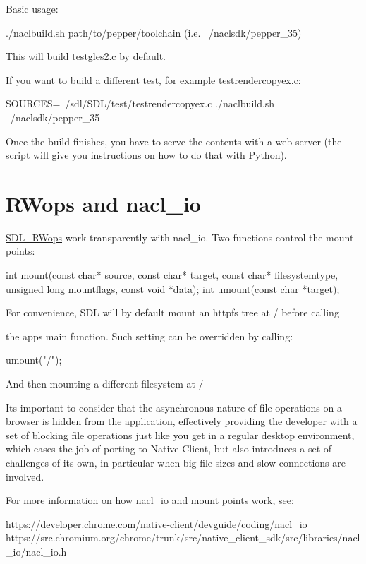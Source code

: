 Basic usage\+: \begin{DoxyVerb}./naclbuild.sh path/to/pepper/toolchain (i.e. ~/naclsdk/pepper_35)
\end{DoxyVerb}


This will build testgles2.\+c by default.

If you want to build a different test, for example testrendercopyex.\+c\+: \begin{DoxyVerb}SOURCES=~/sdl/SDL/test/testrendercopyex.c ./naclbuild.sh ~/naclsdk/pepper_35
\end{DoxyVerb}


Once the build finishes, you have to serve the contents with a web server (the script will give you instructions on how to do that with Python). 

 \section*{R\+Wops and nacl\+\_\+io }

\mbox{\hyperlink{struct_s_d_l___r_wops}{S\+D\+L\+\_\+\+R\+Wops}} work transparently with nacl\+\_\+io. Two functions control the mount points\+: \begin{DoxyVerb}int mount(const char* source, const char* target, 
                  const char* filesystemtype, 
                  unsigned long mountflags, const void *data);
int umount(const char *target);

For convenience, SDL will by default mount an httpfs tree at / before calling 
\end{DoxyVerb}
 the app\textquotesingle{}s main function. Such setting can be overridden by calling\+: \begin{DoxyVerb}umount("/");
\end{DoxyVerb}


And then mounting a different filesystem at /

It\textquotesingle{}s important to consider that the asynchronous nature of file operations on a browser is hidden from the application, effectively providing the developer with a set of blocking file operations just like you get in a regular desktop environment, which eases the job of porting to Native Client, but also introduces a set of challenges of its own, in particular when big file sizes and slow connections are involved.

For more information on how nacl\+\_\+io and mount points work, see\+: \begin{DoxyVerb}https://developer.chrome.com/native-client/devguide/coding/nacl_io
https://src.chromium.org/chrome/trunk/src/native_client_sdk/src/libraries/nacl_io/nacl_io.h
\end{DoxyVerb}



